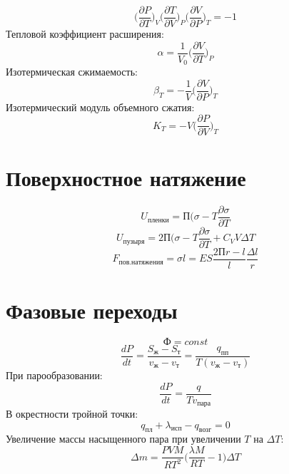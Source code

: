 \documentclass[12pt]{article}
\begin{document}
\begin{equation*}
\bigg(\frac{\partial P}{\partial T}\bigg)_V\bigg(\frac{\partial T}{\partial V}\bigg)_P\bigg(\frac{\partial V}{\partial P}\bigg)_T = -1
\end{equation*}
Тепловой коэффициент расширения:
\begin{equation*}
\alpha =
\frac{1}{V_0}\bigg(\frac{\partial V}{\partial T}\bigg)_P
\end{equation*}
Изотермическая сжимаемость:
\begin{equation*}
\beta_T = -\frac{1}{V}\bigg(\frac{\partial V}{\partial P}\bigg)_T
\end{equation*}
Изотермический модуль объемного сжатия:
\begin{equation*}
K_T = -V\bigg(\frac{\partial P}{\partial V}\bigg)_T
\end{equation*}
\section{Поверхностное натяжение}
\begin{equation*}
U_{пленки} = П(\sigma - T \frac{\partial \sigma}{\partial T}
\end{equation*}
\begin{equation*}
U_{пузыря} = 2П(\sigma - T \frac{\partial \sigma}{\partial T} + C_V V \Delta T
\end{equation*}
\begin{equation*}
F_{пов. натяжения} = \sigma l = ES \frac{2Пr - l}{l} \frac{\Delta l}{r}
\end{equation*}
\section{Фазовые переходы}
\begin{equation*}
Ф = const
\end{equation*}
\begin{equation*}
\frac{dP}{dt} = \frac{S_ж - S_т}{v_ж - v_т} = \frac{q_{пп}}{T(v_ж - v_т)}
\end{equation*}
При парообразовании:
\begin{equation*}
\frac{dP}{dt} = \frac{q}{Tv_{пара}} 
\end{equation*}
В окрестности тройной точки:
\begin{equation*}
q_{пл} + \lambda_{исп} - q_{возг} = 0
\end{equation*}
Увеличение массы насыщенного пара при увеличении $T$ на $\Delta T$:
\begin{equation*}
\Delta m = \frac{PVM}{RT^2}\bigg(\frac{\lambda M}{RT}-1\bigg)\Delta T
\end{equation*}
\end{document}

